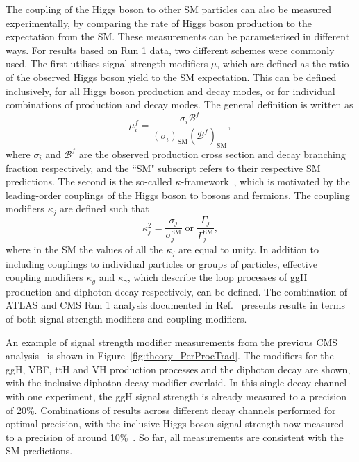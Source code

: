 The coupling of the Higgs boson to other SM particles can also be measured experimentally, 
by comparing the rate of Higgs boson production to the expectation from the SM.
These measurements can be parameterised in different ways.
For results based on Run 1 data, two different schemes were commonly used.
The first utilises signal strength modifiers $\mu$, 
which are defined as the ratio of the observed Higgs boson yield to the SM expectation.
This can be defined inclusively, for all Higgs boson production and decay modes, 
or for individual combinations of production and decay modes.
The general definition is written as
\begin{equation}
\mu^f_i = \frac{\sigma_i\mathcal{B}^f}{(\sigma_i)_{\textrm{SM}}(\mathcal{B}^f)_{\textrm{SM}}} ,
\end{equation}
where $\sigma_i$ and $\mathcal{B}^f$ are the observed production cross section 
and decay branching fraction respectively, 
and the ``SM" subscript refers to their respective SM predictions.
The second is the so-called $\kappa$-framework~\cite{YR3}, 
which is motivated by the leading-order couplings of the Higgs boson to bosons and fermions.
The coupling modifiers $\kappa_j$ are defined such that 
\begin{equation}
\kappa^2_j = \frac{\sigma_j}{\sigma_j^{\textrm{SM}}} \; \mathrm{or} \; \frac{\Gamma_j}{\Gamma_j^{\textrm{SM}}} ,
\end{equation}
where in the SM the values of all the $\kappa_j$ are equal to unity.
In addition to including couplings to individual particles or groups of particles, 
effective coupling modifiers $\kappa_g$ and $\kappa_\gamma$, 
which describe the loop processes of ggH production and diphoton decay respectively, can be defined.
The combination of ATLAS and CMS Run 1 analysis documented in Ref.~\cite{ATLASandCMScouplingsRun1} 
presents results in terms of both signal strength modifiers and coupling modifiers.

An example of signal strength modifier measurements 
from the previous CMS \Hgg analysis~\cite{HIG-16-040} is shown in Figure~\ref{fig:theory_PerProcTrad}.
The modifiers for the ggH, VBF, ttH and VH production processes and the diphoton decay are shown, 
with the inclusive diphoton decay modifier overlaid.
In this single decay channel with one experiment, 
the ggH signal strength is already measured to a precision of 20\%.
Combinations of results across different decay channels performed for optimal precision,
with the inclusive Higgs boson signal strength now measured 
to a precision of around 10\%~\cite{ATLAScomb,CMScomb}.
So far, all measurements are consistent with the SM predictions.

